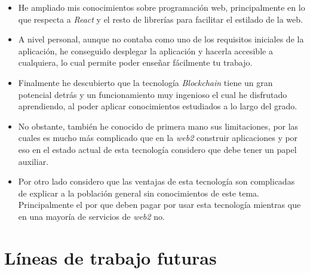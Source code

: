 \begin{itemize}
    \item He ampliado mis conocimientos sobre programación web, principalmente en lo que respecta a \textit{React} y el resto de librerías para facilitar el estilado de la web.
    \item A nivel personal, aunque no contaba como uno de los requisitos iniciales de la aplicación, he conseguido desplegar la aplicación y hacerla accesible a cualquiera, lo cual permite poder enseñar fácilmente tu trabajo.
    \item Finalmente he descubierto que la tecnología \textit{Blockchain} tiene un gran potencial detrás y un funcionamiento muy ingenioso el cual he disfrutado aprendiendo, al poder aplicar conocimientos estudiados a lo largo del grado.
    \item No obstante, también he conocido de primera mano sus limitaciones, por las cuales es mucho más complicado que en la \textit{web2} construir aplicaciones y por eso en el estado actual de esta tecnología considero que debe tener un papel auxiliar.
    \item Por otro lado considero que las ventajas de esta tecnología son complicadas de explicar a la población general sin conocimientos de este tema. Principalmente el por que deben pagar por usar esta tecnología mientras que en una mayoría de servicios de \textit{web2} no.
\end{itemize}

\section{Líneas de trabajo futuras}

